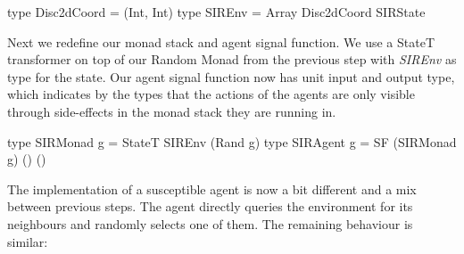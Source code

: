\begin{HaskellCode}
type Disc2dCoord = (Int, Int)
type SIREnv      = Array Disc2dCoord SIRState
\end{HaskellCode}

Next we redefine our monad stack and agent signal function. We use a StateT transformer on top of our Random Monad from the previous step with \textit{SIREnv} as type for the state. Our agent signal function now has unit input and output type, which indicates by the types that the actions of the agents are only visible through side-effects in the monad stack they are running in.

\begin{HaskellCode}
type SIRMonad g = StateT SIREnv (Rand g)
type SIRAgent g = SF (SIRMonad g) () ()
\end{HaskellCode}

The implementation of a susceptible agent is now a bit different and a mix between previous steps. The agent directly queries the environment for its neighbours and randomly selects one of them. The remaining behaviour is similar:

